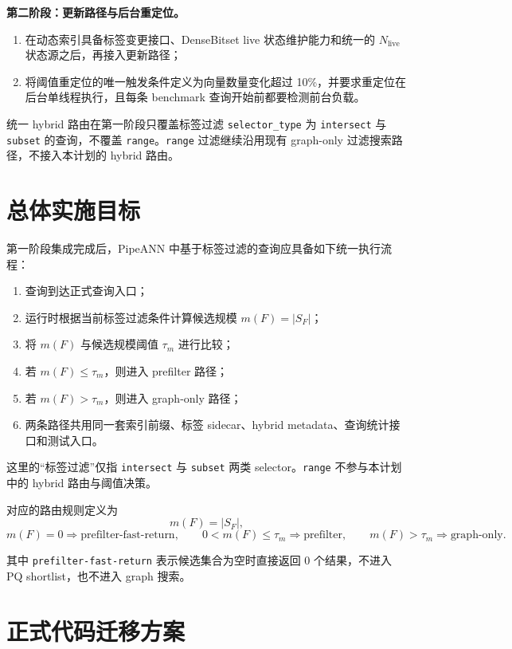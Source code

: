 \documentclass[UTF8]{ctexart}
\begin{document}
\textbf{第二阶段：更新路径与后台重定位。}

\begin{enumerate}
\item 在动态索引具备标签变更接口、DenseBitset live 状态维护能力和统一的 \(N_{\text{live}}\) 状态源之后，再接入更新路径；
\item 将阈值重定位的唯一触发条件定义为向量数量变化超过 10\%，并要求重定位在后台单线程执行，且每条 benchmark 查询开始前都要检测前台负载。
\end{enumerate}

统一 hybrid 路由在第一阶段只覆盖标签过滤 \texttt{selector\_type} 为 \texttt{intersect} 与 \texttt{subset} 的查询，不覆盖 \texttt{range}。\texttt{range} 过滤继续沿用现有 graph-only 过滤搜索路径，不接入本计划的 hybrid 路由。

\section{总体实施目标}
第一阶段集成完成后，PipeANN 中基于标签过滤的查询应具备如下统一执行流程：

\begin{enumerate}
\item 查询到达正式查询入口；
\item 运行时根据当前标签过滤条件计算候选规模 \(m(F)=|S_F|\)；
\item 将 \(m(F)\) 与候选规模阈值 \(\tau_m\) 进行比较；
\item 若 \(m(F)\le \tau_m\)，则进入 prefilter 路径；
\item 若 \(m(F)>\tau_m\)，则进入 graph-only 路径；
\item 两条路径共用同一套索引前缀、标签 sidecar、hybrid metadata、查询统计接口和测试入口。
\end{enumerate}

这里的“标签过滤”仅指 \texttt{intersect} 与 \texttt{subset} 两类 selector。\texttt{range} 不参与本计划中的 hybrid 路由与阈值决策。

对应的路由规则定义为
\[
m(F)=|S_F|,
\]
\[
m(F)=0 \Rightarrow \text{prefilter-fast-return},
\qquad
0 < m(F) \le \tau_m \Rightarrow \text{prefilter},
\qquad
m(F) > \tau_m \Rightarrow \text{graph-only}.
\]

其中 \texttt{prefilter-fast-return} 表示候选集合为空时直接返回 0 个结果，不进入 PQ shortlist，也不进入 graph 搜索。

\section{正式代码迁移方案}
\end{document}
